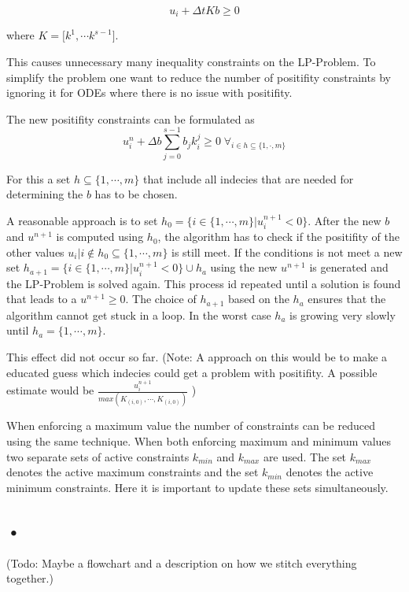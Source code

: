 \documentclass{article}
\begin{document}
\begin{equation}
u_i + \Delta t K  b \geq 0     
\end{equation}

where $K = \big[k^1 , \cdots k^{s-1}\big]$.

This causes unnecessary many inequality constraints on the LP-Problem. To simplify the problem one want to reduce the number of positifity constraints by ignoring it for ODEs where there is no issue with positifity.

The new positifity constraints can be formulated as
\begin{equation}
u_i^n + \Delta b \sum_{j=0}^{s-1} b_j k_i^j  \geq 0   \;   \forall_{i \in h \subseteq \{1,\cdot,m \}} 
\end{equation}

For this a set $h \subseteq \{1,\cdots,m \}$ that include all indecies that are needed for determining the $b$ has to be chosen.

A reasonable approach is to set $h_0 = \{ i \in \{1,\cdots,m \} |  u_i^{n+1}  < 0 \}$. 
After the new $b$ and $u^{n+1}$ is computed using $h_0$, the algorithm has to check if the positifity of the other values $u_i | i \notin h_0 \subseteq \{1,\cdots,m \}$ is still meet. 
If the conditions is not meet a new set $h_{a+1} = \{ i \in \{1,\cdots,m \}|  u_i^{n+1}  < 0 \} \cup h_{a}$ using the new $u^{n+1}$ is generated and the LP-Problem is solved again. This process id repeated until a solution is found that leads to a $u^{n+1} \geq 0$. The choice of $h_{a+1}$ based on the $h_{a}$ ensures that the algorithm cannot get stuck in a loop. In the worst case $h_a$ is growing very slowly until $h_a = \{1,\cdots,m \}$. 

This effect did not occur so far. 
(Note: A approach on this would be to make a educated guess which indecies could get a problem with positifity. A possible estimate would be $\frac{u_i^{n+1}}{max(K_{(i,0)}, \cdots ,K_{(i,0)})} $ )

When enforcing a maximum value the number of constraints can be reduced using the same technique. When both enforcing maximum and minimum values two separate sets of active constraints $k_{min}$ and $k_{max}$ are used. The set $k_{max}$ denotes the active maximum constraints and the set $k_{min}$ denotes the active minimum constraints. 
Here it is important to update these sets simultaneously.  

\subsection{•}
(Todo: Maybe a flowchart and a description on how we stitch everything together.) 
\end{document}
